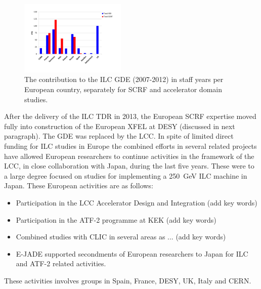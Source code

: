\documentclass[%
 reprint,
 amsmath,amssymb,
 aps,
]{revtex4-1}
\begin{document}
\begin{figure}[htbp]
\includegraphics[width=0.45\textwidth]{figures/EU-GDE-FTE-columns-per-country.pdf}
\caption{\label{fig:PrePrep:ilcgde4} The contribution to the ILC GDE (2007-2012) in staff years per European country, separately for SCRF and accelerator domain studies.}
\end{figure}

After the delivery of the ILC TDR in 2013, the European SCRF expertise moved fully into construction of the European XFEL at DESY (discussed in next paragraph). 
The GDE was replaced by the LCC. In spite of limited direct funding for ILC studies in Europe the combined efforts in 
several related projects have allowed European researchers to continue activities in the framework of the LCC, in close collaboration with Japan, during
the last five years. These were to a large degree focused on studies for implementing a 250~GeV ILC machine in Japan. 
These European activities are as follows:
\begin{itemize}
\item Participation in the LCC Accelerator Design and Integration (add key words)
\item Participation in the ATF-2 programme at KEK (add key words)
\item Combined studies with CLIC in several areas as ... (add key words)
\item E-JADE supported secondments of European researchers to Japan for ILC and ATF-2 related activities.
\end{itemize}
These activities involves groups in Spain, France, DESY, UK, Italy and CERN. 


\end{document}
